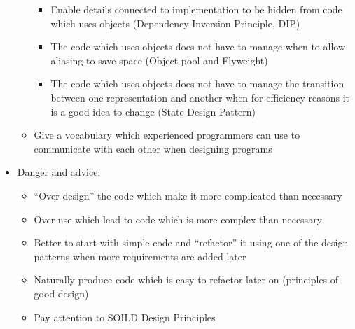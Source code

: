 \documentclass[12pt,openany]{book}
\begin{document}
\begin{itemize}
\begin{itemize}
\begin{itemize}
            \item Enable details connected to implementation to be hidden from code which uses objects (Dependency Inversion Principle, DIP)
            \item The code which uses objects does not have to manage when to allow aliasing to save space (Object pool and Flyweight)
            \item The code which uses objects does not have to manage the transition between one representation and another when for efficiency reasons it is a good idea to change (State Design Pattern)
        \end{itemize}
        \item Give a vocabulary which experienced programmers can use to communicate with each other when designing programs
    \end{itemize}
    \item Danger and advice:
    \begin{itemize}
        \item ``Over-design'' the code which make it more complicated than necessary
        \item Over-use which lead to code which is more complex than necessary
        \item Better to start with simple code and “refactor” it using one of the design patterns when more requirements are added later
        \item Naturally produce code which is easy to refactor later on (principles of good design)
        \item Pay attention to SOILD Design Principles
    \end{itemize}
\end{itemize}
\end{document}
